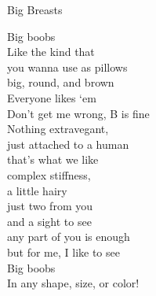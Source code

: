 Big Breasts

Big boobs\\
Like the kind that\\
you wanna use as pillows\\
big, round, and brown\\
Everyone likes `em\\
Don't get me wrong, B is fine\\
Nothing extravegant,\\
just attached to a human\\
that's what we like\\
complex stiffness,\\
a little hairy\\
just two from you\\
and a sight to see\\
any part of you is enough\\
but for me, I like to see\\
Big boobs\\
In any shape, size,
or color!\\

